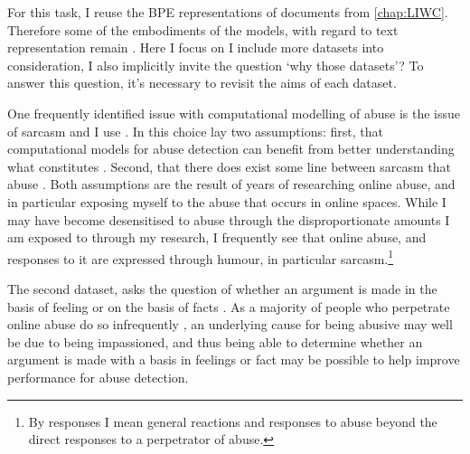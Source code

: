 {For this task, I reuse the BPE representations of documents from \autoref{chap:LIWC}.
Therefore some of the embodiments of the models, with regard to text representation remain .
Here I focus on 
 I include more datasets into consideration, I also implicitly invite the question `why those datasets'?
To answer this question, it's necessary to revisit the aims of each dataset.

One frequently identified issue with computational modelling of abuse is the issue of sarcasm \citep{Rottger:2021} and I use \citet{Oraby_sarcasm:2016}.
In this choice lay two assumptions: first, that computational models for abuse detection can benefit from better understanding what constitutes .
Second, that there does exist some line between  sarcasm  that  abuse .
Both assumptions are the result of years of researching online abuse, and in particular exposing myself to the abuse that occurs in online spaces.
While I may have become desensitised to abuse through the disproportionate amounts I am exposed to through my research, I frequently see that online abuse, and responses to it are expressed through humour, in particular sarcasm.\footnote{By responses I mean general reactions and responses to abuse beyond the direct responses to a perpetrator of abuse.}

The second dataset, asks the question of whether an argument is made in the basis of feeling or on the basis of facts \citep{Oraby_factfeel:2015}.
As a majority of people who perpetrate online abuse do so infrequently \citep{Waseem-Hovy:2016}, an underlying cause for being abusive may well be due to being impassioned, and thus being able to determine whether an argument is made with a basis in feelings or fact may be possible to help improve performance for abuse detection.

}
